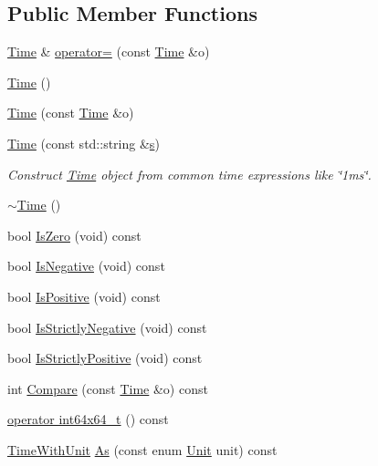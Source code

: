 \subsection*{Public Member Functions}
\begin{DoxyCompactItemize}
\item 
\hyperlink{classns3_1_1Time}{Time} \& \hyperlink{classns3_1_1Time_afa9b5f477aebb2c8cd8ca38c286fd015}{operator=} (const \hyperlink{classns3_1_1Time}{Time} \&o)
\item 
\hyperlink{classns3_1_1Time_a8a39dc1b8cbbd7fe6d940e492d1b925e}{Time} ()
\item 
\hyperlink{classns3_1_1Time_a20d49a6a4661c378ce3662ad0f3c4f52}{Time} (const \hyperlink{classns3_1_1Time}{Time} \&o)
\item 
\hyperlink{classns3_1_1Time_addbf69c7aec0f3fd8c0595426d88622e}{Time} (const std\+::string \&\hyperlink{generate__test__data__lte__sinr_8m_ad83eeb3a142285d1243a08c6b7026df8}{s})
\begin{DoxyCompactList}\small\item\em Construct \hyperlink{classns3_1_1Time}{Time} object from common time expressions like \char`\"{}1ms\char`\"{}. \end{DoxyCompactList}\item 
\hyperlink{classns3_1_1Time_a3671ab4d1ca22b7701aa938b22ccb3bf}{$\sim$\+Time} ()
\item 
bool \hyperlink{classns3_1_1Time_ae47420e5c8a04d222b18ee13c2a95799}{Is\+Zero} (void) const 
\item 
bool \hyperlink{classns3_1_1Time_acba4da184583f57a5ff679aa92febf53}{Is\+Negative} (void) const 
\item 
bool \hyperlink{classns3_1_1Time_a6fd05cdd16ac62e6952c85b2989ec597}{Is\+Positive} (void) const 
\item 
bool \hyperlink{classns3_1_1Time_afcfe13a082fca60fa3442a1fb579a2ed}{Is\+Strictly\+Negative} (void) const 
\item 
bool \hyperlink{classns3_1_1Time_a725fcbc267127acfac451f9026c190c6}{Is\+Strictly\+Positive} (void) const 
\item 
int \hyperlink{classns3_1_1Time_a9304fc11853d7f3203749cbac217a2fb}{Compare} (const \hyperlink{classns3_1_1Time}{Time} \&o) const 
\item 
\hyperlink{classns3_1_1Time_a399c289b6a7ceed03d583b46037169b9}{operator int64x64\+\_\+t} () const 
\item 
\hyperlink{classns3_1_1TimeWithUnit}{Time\+With\+Unit} \hyperlink{classns3_1_1Time_a0bb1110638ce9938248bd07865a328ab}{As} (const enum \hyperlink{classns3_1_1Time_a87a7f4d29c68b047a72d291ad660295a}{Unit} unit) const 
\end{DoxyCompactItemize}
